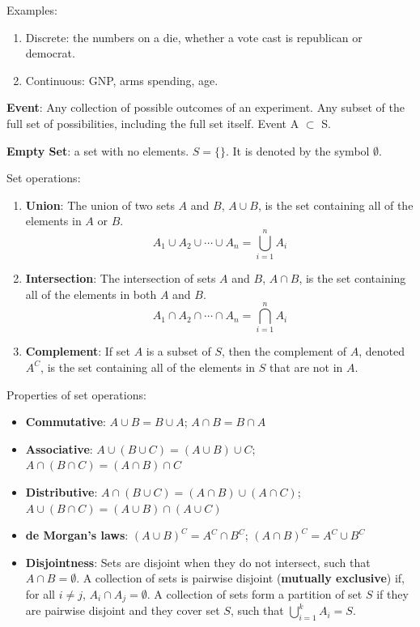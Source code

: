 \documentclass[]{book}
\providecommand{\tightlist}{%
  \setlength{\itemsep}{0pt}\setlength{\parskip}{0pt}}
\theoremstyle{definition}
\theoremstyle{definition}
\theoremstyle{definition}
\theoremstyle{remark}
\begin{document}
Examples:

\begin{enumerate}
\def\labelenumi{\arabic{enumi}.}
\tightlist
\item
  Discrete: the numbers on a die, whether a vote cast is republican or
  democrat.
\item
  Continuous: GNP, arms spending, age.
\end{enumerate}

\textbf{Event}: Any collection of possible outcomes of an experiment.
Any subset of the full set of possibilities, including the full set
itself. Event A \(\subset\) S.

\textbf{Empty Set}: a set with no elements. \(S = \{\}\). It is denoted
by the symbol \(\emptyset\).

Set operations:

\begin{enumerate}
\def\labelenumi{\arabic{enumi}.}
\tightlist
\item
  \textbf{Union}: The union of two sets \(A\) and \(B\), \(A \cup B\),
  is the set containing all of the elements in \(A\) or \(B\).
  \[A_1 \cup A_2  \cup \cdots \cup A_n = \bigcup_{i=1}^n A_i\]
\item
  \textbf{Intersection}: The intersection of sets \(A\) and \(B\),
  \(A \cap B\), is the set containing all of the elements in both \(A\)
  and \(B\).
  \[A_1 \cap A_2  \cap \cdots \cap A_n = \bigcap_{i=1}^n A_i\]
\item
  \textbf{Complement}: If set \(A\) is a subset of \(S\), then the
  complement of \(A\), denoted \(A^C\), is the set containing all of the
  elements in \(S\) that are not in \(A\).
\end{enumerate}

Properties of set operations:

\begin{itemize}
\tightlist
\item
  \textbf{Commutative}: \(A \cup B = B \cup A\); \(A \cap B = B \cap A\)
\item
  \textbf{Associative}: \(A \cup (B \cup C) = (A \cup B) \cup C\);
  \(A \cap (B \cap C) = (A \cap B) \cap C\)
\item
  \textbf{Distributive}:
  \(A \cap (B \cup C) = (A \cap B) \cup (A \cap C)\);
  \(A \cup (B \cap C) = (A \cup B) \cap (A \cup C)\)
\item
  \textbf{de Morgan's laws}: \((A \cup B)^C = A^C \cap B^C\);
  \((A \cap B)^C = A^C \cup B^C\)
\item
  \textbf{Disjointness}: Sets are disjoint when they do not intersect,
  such that \(A \cap B = \emptyset\). A collection of sets is pairwise
  disjoint (\textbf{mutually exclusive}) if, for all \(i \neq j\),
  \(A_i \cap A_j = \emptyset\). A collection of sets form a partition of
  set \(S\) if they are pairwise disjoint and they cover set \(S\), such
  that \(\bigcup_{i = 1}^k A_i = S\).
\end{itemize}
\end{document}
